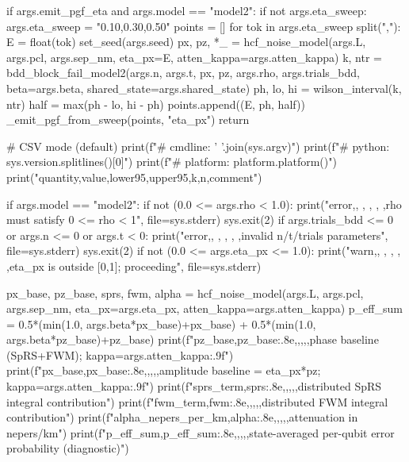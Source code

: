 {{{{    if args.emit_pgf_eta and args.model == "model2":
        if not args.eta_sweep:
            args.eta_sweep = "0.10,0.30,0.50"
        points = []
        for tok in args.eta_sweep split(","):
            E = float(tok)
            set_seed(args.seed)
            px, pz, *_ = hcf_noise_model(args.L, args.pcl, args.sep_nm, eta_px=E, atten_kappa=args.atten_kappa)
            k, ntr = bdd_block_fail_model2(args.n, args.t, px, pz, args.rho, args.trials_bdd, beta=args.beta, shared_state=args.shared_state)
            ph, lo, hi = wilson_interval(k, ntr)
            half = max(ph - lo, hi - ph)
            points.append((E, ph, half))
        _emit_pgf_from_sweep(points, "eta_px")
        return

    # CSV mode (default)
    print(f"# cmdline: {' '.join(sys.argv)}")
    print(f"# python: {sys.version.splitlines()[0]}")
    print(f"# platform: {platform.platform()}")
    print("quantity,value,lower95,upper95,k,n,comment")

    if args.model == "model2":
        if not (0.0 <= args.rho < 1.0):
            print("error,, , , , ,rho must satisfy 0 <= rho < 1", file=sys.stderr)
            sys.exit(2)
        if args.trials_bdd <= 0 or args.n <= 0 or args.t < 0:
            print("error,, , , , ,invalid n/t/trials parameters", file=sys.stderr)
            sys.exit(2)
        if not (0.0 <= args.eta_px <= 1.0):
            print("warn,, , , , ,eta_px is outside [0,1]; proceeding", file=sys.stderr)

        px_base, pz_base, sprs, fwm, alpha = hcf_noise_model(args.L, args.pcl, args.sep_nm,
                                                             eta_px=args.eta_px, atten_kappa=args.atten_kappa)
        p_eff_sum = 0.5*(min(1.0, args.beta*px_base)+px_base) + 0.5*(min(1.0, args.beta*pz_base)+pz_base)
        print(f"pz_base,{pz_base:.8e},,,,,phase baseline (SpRS+FWM); kappa={args.atten_kappa:.9f}")
        print(f"px_base,{px_base:.8e},,,,,amplitude baseline = eta_px*pz; kappa={args.atten_kappa:.9f}")
        print(f"sprs_term,{sprs:.8e},,,,,distributed SpRS integral contribution")
        print(f"fwm_term,{fwm:.8e},,,,,distributed FWM integral contribution")
        print(f"alpha_nepers_per_km,{alpha:.8e},,,,,attenuation in nepers/km")
        print(f"p_eff_sum,{p_eff_sum:.8e},,,,,state-averaged per-qubit error probability (diagnostic)")

}}}}
